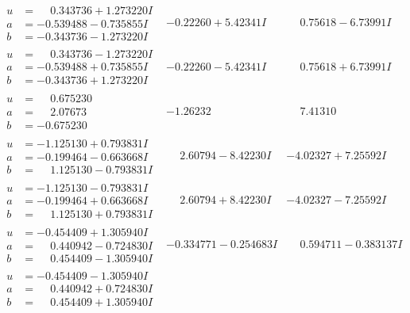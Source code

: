 \documentclass[1p]{elsarticle_modified}
\theoremstyle{definition}
\begin{document}
$$\begin{array}{c|c|c}
\begin{aligned}
u &= \phantom{-}0.343736 + 1.273220 I \\
a &= -0.539488 - 0.735855 I \\
b &= -0.343736 - 1.273220 I\end{aligned}
 & -0.22260 + 5.42341 I & \phantom{-}0.75618 - 6.73991 I \\ \hline\begin{aligned}
u &= \phantom{-}0.343736 - 1.273220 I \\
a &= -0.539488 + 0.735855 I \\
b &= -0.343736 + 1.273220 I\end{aligned}
 & -0.22260 - 5.42341 I & \phantom{-}0.75618 + 6.73991 I \\ \hline\begin{aligned}
u &= \phantom{-}0.675230\phantom{ +0.000000I} \\
a &= \phantom{-}2.07673\phantom{ +0.000000I} \\
b &= -0.675230\phantom{ +0.000000I}\end{aligned}
 & -1.26232\phantom{ +0.000000I} & \phantom{-}7.41310\phantom{ +0.000000I} \\ \hline\begin{aligned}
u &= -1.125130 + 0.793831 I \\
a &= -0.199464 - 0.663668 I \\
b &= \phantom{-}1.125130 - 0.793831 I\end{aligned}
 & \phantom{-}2.60794 - 8.42230 I & -4.02327 + 7.25592 I \\ \hline\begin{aligned}
u &= -1.125130 - 0.793831 I \\
a &= -0.199464 + 0.663668 I \\
b &= \phantom{-}1.125130 + 0.793831 I\end{aligned}
 & \phantom{-}2.60794 + 8.42230 I & -4.02327 - 7.25592 I \\ \hline\begin{aligned}
u &= -0.454409 + 1.305940 I \\
a &= \phantom{-}0.440942 - 0.724830 I \\
b &= \phantom{-}0.454409 - 1.305940 I\end{aligned}
 & -0.334771 - 0.254683 I & \phantom{-}0.594711 - 0.383137 I \\ \hline\begin{aligned}
u &= -0.454409 - 1.305940 I \\
a &= \phantom{-}0.440942 + 0.724830 I \\
b &= \phantom{-}0.454409 + 1.305940 I\end{aligned}

\end{array}$$
\end{document}
